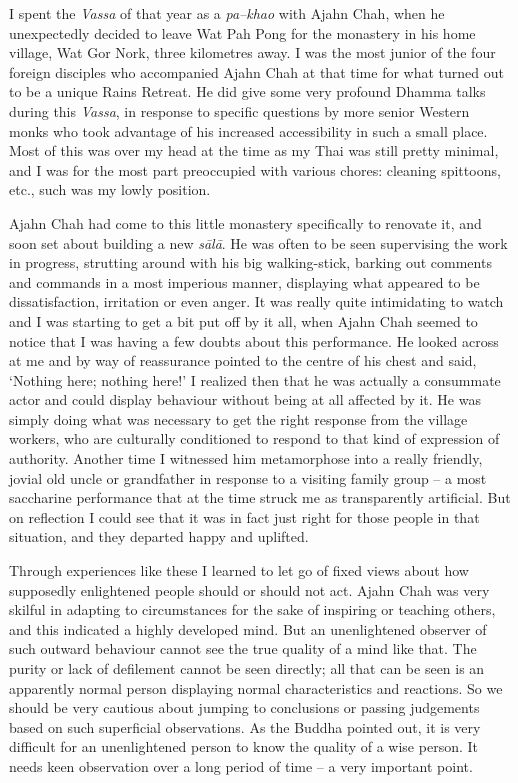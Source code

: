 I spent the \emph{Vassa} of that year as a \emph{pa--khao} with Ajahn
Chah, when he unexpectedly decided to leave Wat Pah Pong for the
monastery in his home village, Wat Gor Nork, three kilometres away. I
was the most junior of the four foreign disciples who accompanied Ajahn
Chah at that time for what turned out to be a unique Rains Retreat. He
did give some very profound Dhamma talks during this \emph{Vassa}, in
response to specific questions by more senior Western monks who took
advantage of his increased accessibility in such a small place. Most of
this was over my head at the time as my Thai was still pretty minimal,
and I was for the most part preoccupied with various chores: cleaning
spittoons, etc., such was my lowly position.

Ajahn Chah had come to this little monastery specifically to renovate
it, and soon set about building a new \emph{sālā}. He was often to be
seen supervising the work in progress, strutting around with his big
walking-stick, barking out comments and commands in a most imperious
manner, displaying what appeared to be dissatisfaction, irritation or
even anger. It was really quite intimidating to watch and I was starting
to get a bit put off by it all, when Ajahn Chah seemed to notice that I
was having a few doubts about this performance. He looked across at me
and by way of reassurance pointed to the centre of his chest and said,
`Nothing here; nothing here!' I realized then that he was actually a
consummate actor and could display behaviour without being at all
affected by it. He was simply doing what was necessary to get the right
response from the village workers, who are culturally conditioned to
respond to that kind of expression of authority. Another time I
witnessed him metamorphose into a really friendly, jovial old uncle or
grandfather in response to a visiting family group -- a most saccharine
performance that at the time struck me as transparently artificial. But
on reflection I could see that it was in fact just right for those
people in that situation, and they departed happy and uplifted.

Through experiences like these I learned to let go of fixed views about
how supposedly enlightened people should or should not act. Ajahn Chah
was very skilful in adapting to circumstances for the sake of inspiring
or teaching others, and this indicated a highly developed mind. But an
unenlightened observer of such outward behaviour cannot see the true
quality of a mind like that. The purity or lack of defilement cannot be
seen directly; all that can be seen is an apparently normal person
displaying normal characteristics and reactions. So we should be very
cautious about jumping to conclusions or passing judgements based on
such superficial observations. As the Buddha pointed out, it is very
difficult for an unenlightened person to know the quality of a wise
person. It needs keen observation over a long period of time -- a very
important point.

